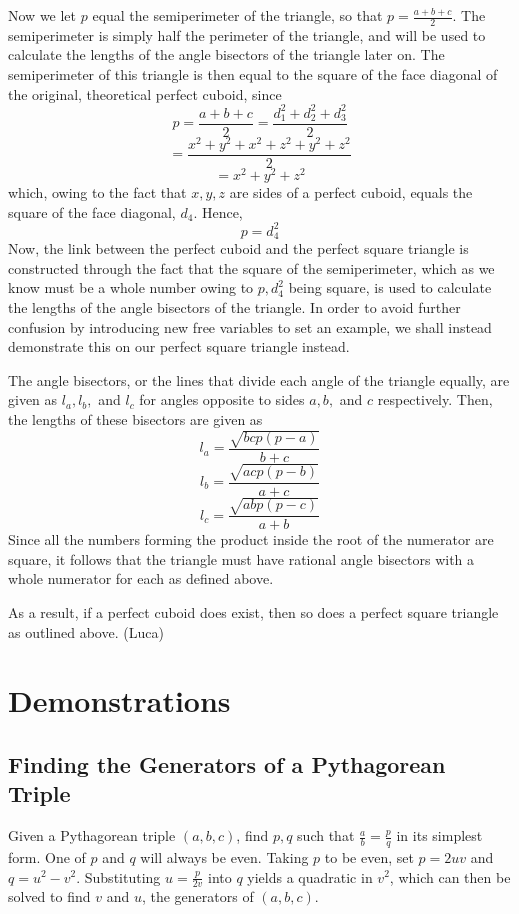 \documentclass[11pt]{article}
\begin{document}
\begin{appendices}
Now we let $p$ equal the semiperimeter of the triangle, so that $p=\frac{a+b+c}{2}$. The semiperimeter is simply half the perimeter of the triangle, and will be used to calculate the lengths of the angle bisectors of the triangle later on. The semiperimeter of this triangle is then equal to the square of the face diagonal of the original, theoretical perfect cuboid, since
$$p=\frac{a+b+c}{2}=\frac{d_1^2+d_2^2+d_3^2}{2}$$
$$=\frac{x^2+y^2+x^2+z^2+y^2+z^2}{2}$$
$$=x^2+y^2+z^2$$
which, owing to the fact that $x, y, z$ are sides of a perfect cuboid, equals the square of the face diagonal, $d_4$. Hence,
$$p=d_4^2$$
Now, the link between the perfect cuboid and the perfect square triangle is constructed through the fact that the square of the semiperimeter, which as we know must be a whole number owing to $p, d_4^2$ being square, is used to calculate the lengths of the angle bisectors of the triangle. In order to avoid further confusion by introducing new free variables to set an example, we shall instead demonstrate this on our perfect square triangle instead. 

The angle bisectors, or the lines that divide each angle of the triangle equally, are given as $l_a, l_b,$ and $l_c$ for angles opposite to sides $a, b,$ and $c$ respectively. Then, the lengths of these bisectors are given as
$$l_a=\frac{\sqrt{bcp(p-a)}}{b+c}$$
$$l_b=\frac{\sqrt{acp(p-b)}}{a+c}$$
$$l_c=\frac{\sqrt{abp(p-c)}}{a+b}$$
Since all the numbers forming the product inside the root of the numerator are square, it follows that the triangle must have rational angle bisectors with a whole numerator for each as defined above.

As a result, if a perfect cuboid does exist, then so does a perfect square triangle as outlined above. (Luca) \cite{luca}


\section{Demonstrations}
\label{appendix:par}
\subsection{Finding the Generators of a Pythagorean Triple}
Given a Pythagorean triple $(a,b,c)$, find $p, q$ such that $\frac{a}{b}=\frac{p}{q}$ in its simplest form. One of $p$ and $q$ will always be even. Taking $p$ to be even, set $p=2uv$ and $q=u^2-v^2$. Substituting $u=\frac{p}{2v}$ into $q$ yields a quadratic in $v^2$, which can then be solved to find $v$ and $u$, the generators of $(a,b,c)$.


\end{appendices}
\end{document}
